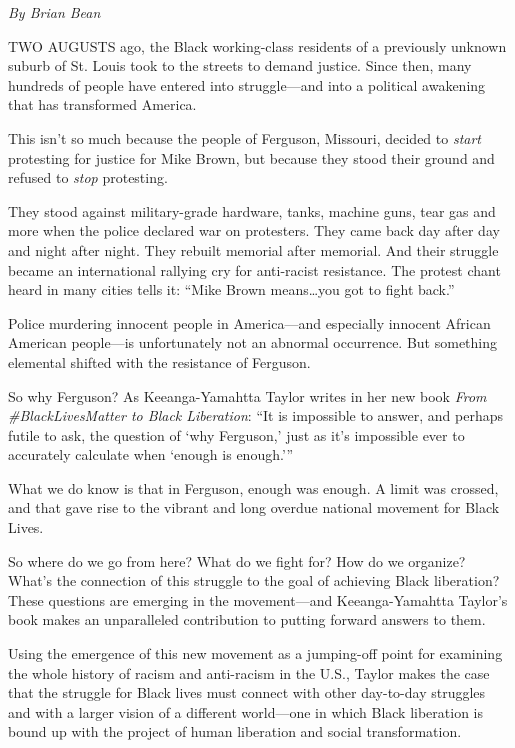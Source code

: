 \emph{By Brian Bean}

TWO AUGUSTS ago, the Black working-class residents of a previously unknown suburb of St. Louis took to the streets to demand justice. Since then, many hundreds of people have entered into struggle---and into a political awakening that has transformed America.

This isn't so much because the people of Ferguson, Missouri, decided to \emph{start} protesting for justice for Mike Brown, but because they stood their ground and refused to \emph{stop} protesting.

They stood against military-grade hardware, tanks, machine guns, tear gas and more when the police declared war on protesters. They came back day after day and night after night. They rebuilt memorial after memorial. And their struggle became an international rallying cry for anti-racist resistance. The protest chant heard in many cities tells it: ``Mike Brown means\ldots you got to fight back.''

Police murdering innocent people in America---and especially innocent African American people---is unfortunately not an abnormal occurrence. But something elemental shifted with the resistance of Ferguson.

So why Ferguson? As Keeanga-Yamahtta Taylor writes in her new book \emph{From \#BlackLivesMatter to Black Liberation}: ``It is impossible to answer, and perhaps futile to ask, the question of `why Ferguson,' just as it's impossible ever to accurately calculate when `enough is enough.'''

What we do know is that in Ferguson, enough was enough. A limit was crossed, and that gave rise to the vibrant and long overdue national movement for Black Lives.

So where do we go from here? What do we fight for? How do we organize? What's the connection of this struggle to the goal of achieving Black liberation? These questions are emerging in the movement---and Keeanga-Yamahtta Taylor's book makes an unparalleled contribution to putting forward answers to them.

Using the emergence of this new movement as a jumping-off point for examining the whole history of racism and anti-racism in the U.S., Taylor makes the case that the struggle for Black lives must connect with other day-to-day struggles and with a larger vision of a different world---one in which Black liberation is bound up with the project of human liberation and social transformation.

